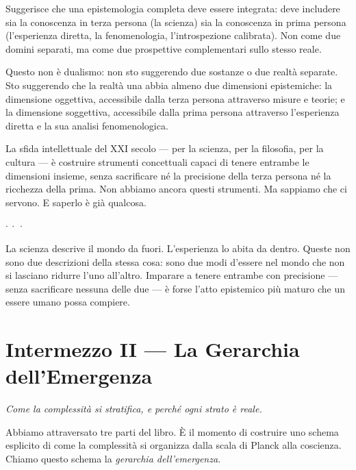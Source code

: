 \documentclass[12pt,a4paper,openany]{book}
\newcommand{\puntini}{\begin{center}$\cdot\ \cdot\ \cdot$\end{center}\vspace{0.3em}}
\begin{document}
Suggerisce che una epistemologia completa deve essere integrata: deve includere sia la conoscenza in terza persona (la scienza) sia la conoscenza in prima persona (l'esperienza diretta, la fenomenologia, l'introspezione calibrata). Non come due domini separati, ma come due prospettive complementari sullo stesso reale.

Questo non è dualismo: non sto suggerendo due sostanze o due realtà separate. Sto suggerendo che la realtà una abbia almeno due dimensioni epistemiche: la dimensione oggettiva, accessibile dalla terza persona attraverso misure e teorie; e la dimensione soggettiva, accessibile dalla prima persona attraverso l'esperienza diretta e la sua analisi fenomenologica.

La sfida intellettuale del XXI secolo --- per la scienza, per la filosofia, per la cultura --- è costruire strumenti concettuali capaci di tenere entrambe le dimensioni insieme, senza sacrificare né la precisione della terza persona né la ricchezza della prima. Non abbiamo ancora questi strumenti. Ma sappiamo che ci servono. E saperlo è già qualcosa.

\puntini

La scienza descrive il mondo da fuori. L'esperienza lo abita da dentro. Queste non sono due descrizioni della stessa cosa: sono due modi d'essere nel mondo che non si lasciano ridurre l'uno all'altro. Imparare a tenere entrambe con precisione --- senza sacrificare nessuna delle due --- è forse l'atto epistemico più maturo che un essere umano possa compiere.

\chapter*{Intermezzo II — La Gerarchia dell'Emergenza}

\begin{center}
\itshape
Come la complessità si stratifica, e perché ogni strato è reale.
\end{center}

\bigskip

Abbiamo attraversato tre parti del libro. È il momento di costruire uno schema esplicito di come la complessità si organizza dalla scala di Planck alla coscienza. Chiamo questo schema la \textit{gerarchia dell'emergenza}.
\end{document}
